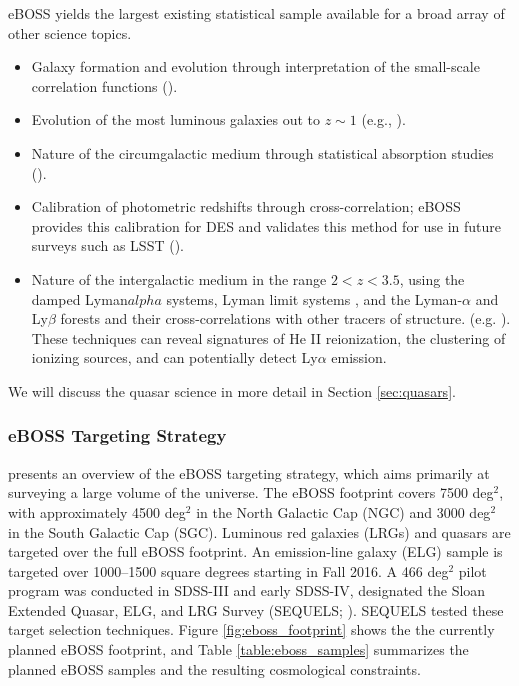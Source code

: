 eBOSS yields the largest existing statistical sample available for a
broad array of other science topics.
\begin{itemize}
\item Galaxy formation and evolution through interpretation of the
small-scale correlation functions (\citealt{zheng07a, leauthaud12a,
guo13a}).
\item Evolution of the most luminous galaxies out to \mbox{$z\sim 1$}
(e.g., \citealt{maraston13a, bundy15b, monterodorta16a}).
\item Nature of the circumgalactic medium through statistical absorption
studies (\citealt{steidel10a, zhu14a, zhu15a}).
\item Calibration of photometric redshifts through cross-correlation;
eBOSS provides this calibration for DES and validates this method
for use in future surveys such as LSST (\citealt{newman15a}).
\item Nature of the intergalactic medium in the range
$2<z<3.5$, using the damped Lyman$alpha$ systems, Lyman limit systems
, and the Lyman-$\alpha$ and Ly$\beta$ forests and their
cross-correlations with other tracers of structure.
(e.g. \citealt{becker13a, pieri14a, lee15a}). These techniques can
reveal signatures of He II reionization, the clustering of ionizing
sources, and can potentially detect Ly$\alpha$ emission.
\end{itemize}

We will discuss the quasar science in more detail in
Section \ref{sec:quasars}.

\subsubsection{eBOSS Targeting Strategy}
\label{sec:eboss:targeting}

\citet{dawson16a} presents an overview of the eBOSS targeting strategy, 
which aims primarily at surveying a large volume of the universe. The
eBOSS footprint covers 7500 deg$^{2}$, with approximately 4500
deg$^{2}$ in the North Galactic Cap (NGC) and 3000 deg$^{2}$ in the
South Galactic Cap (SGC). Luminous red galaxies (LRGs) and quasars
are targeted over the full eBOSS footprint.  An emission-line
galaxy (ELG) sample is targeted over 1000--1500 square degrees
starting in Fall 2016.  A 466 deg$^2$ pilot program was conducted in
SDSS-III and early SDSS-IV, designated the Sloan Extended Quasar, ELG,
and LRG Survey (SEQUELS; \citealt{dawson16a, alam15b}). SEQUELS tested
these target selection techniques. Figure \ref{fig:eboss_footprint}
shows the the currently planned eBOSS footprint, and
Table \ref{table:eboss_samples} summarizes the planned eBOSS samples
and the resulting cosmological constraints.

